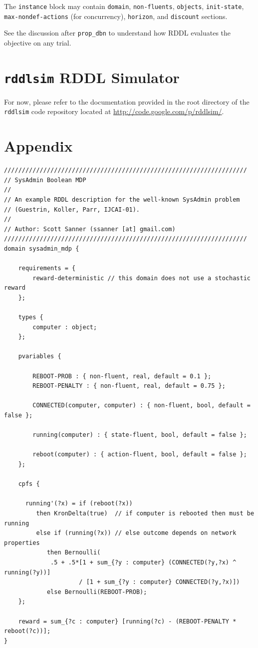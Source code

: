 \documentclass[11pt,a4paper]{article}
\begin{document}
The \texttt{instance} block may contain 
\texttt{domain}, \texttt{non-fluents}, \texttt{objects}, 
\texttt{init-state},\\ \texttt{max-nondef-actions} (for concurrency), 
\texttt{horizon}, and \texttt{discount} sections.

See the discussion after \texttt{prop\_dbn} to understand how RDDL
evaluates the objective on any trial.

\section{\texttt{rddlsim} RDDL Simulator}

For now, please refer to the documentation provided in the
root directory of the \texttt{rddlsim} code repository
located at \url{http://code.google.com/p/rddlsim/}.

 


\COMMENT

\ENDCOMMENT

\newpage

\section*{Appendix}

\begin{lstlisting}[title=sysadmin\_mdp.rddl]
////////////////////////////////////////////////////////////////////
// SysAdmin Boolean MDP 
//
// An example RDDL description for the well-known SysAdmin problem
// (Guestrin, Koller, Parr, IJCAI-01).
//
// Author: Scott Sanner (ssanner [at] gmail.com)
////////////////////////////////////////////////////////////////////
domain sysadmin_mdp {
  
	requirements = { 
		reward-deterministic // this domain does not use a stochastic reward
	};
	
	types {
  		computer : object;
	};
      
	pvariables { 
    		  		    		  		
		REBOOT-PROB : { non-fluent, real, default = 0.1 };
		REBOOT-PENALTY : { non-fluent, real, default = 0.75 };

		CONNECTED(computer, computer) : { non-fluent, bool, default = false };

		running(computer) : { state-fluent, bool, default = false };
      
		reboot(computer) : { action-fluent, bool, default = false }; 
	};
	
	cpfs {
  
	  running'(?x) = if (reboot(?x))
		 then KronDelta(true)  // if computer is rebooted then must be running 
		 else if (running(?x)) // else outcome depends on network properties
		    then Bernoulli(
             .5 + .5*[1 + sum_{?y : computer} (CONNECTED(?y,?x) ^ running(?y))] 
		             / [1 + sum_{?y : computer} CONNECTED(?y,?x)])
		    else Bernoulli(REBOOT-PROB); 
	};
  
	reward = sum_{?c : computer} [running(?c) - (REBOOT-PENALTY * reboot(?c))];
}
\end{lstlisting}
\end{document}
